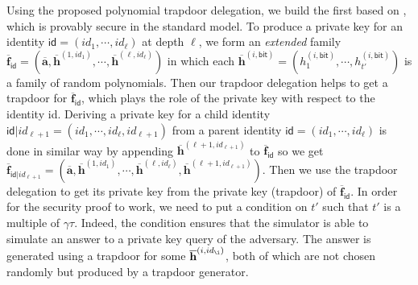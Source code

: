 \documentclass[runningheads]{llncs}
\begin{document}
 Using the proposed polynomial trapdoor delegation, we build the first  based on , which is provably  secure in the standard model. 
 To produce a private key for an identity $\textsf{id}=(id_1, \cdots, id_{\ell})$ at depth $\ell$, 
 we form an \textit{extended} family $\overline{\mathbf{f}}_{\mathsf{id}}=(\overline{\mathbf{a}}, \overline{\mathbf{h}}^{(1,id_1)},  \cdots,\overline{\mathbf{h}}^{(\ell,id_{\ell})})$ in which each $\overline{\mathbf{h}}^{(i,\mathsf{bit})}=(h_1^{(i,\mathsf{bit})}, \cdots,h_{t'}^{(i,\mathsf{bit})} )$ is a family of random polynomials.
Then our trapdoor delegation helps to get a trapdoor for $\overline{\mathbf{f}}_{\mathsf{id}}$, which plays the role of the private key with respect to the identity \textsf{id}. 
Deriving a private key for a child identity $\textsf{id}|id_{\ell+1}=(id_1, \cdots, id_{\ell}, id_{\ell+1})$ from a parent identity $\textsf{id}=(id_1, \cdots, id_{\ell})$ is done in similar way by appending $\overline{\mathbf{h}}^{(\ell+1,id_{\ell+1})}$ to $\overline{\mathbf{f}}_{\mathsf{id}}$  
so we get $\overline{\mathbf{f}}_{\mathsf{id}|id_{\ell+1}}=(\overline{\mathbf{a}},  \overline{\mathbf{h}}^{(1,id_1)},  \cdots,\overline{\mathbf{h}}^{(\ell,id_{\ell})},\overline{\mathbf{h}}^{(\ell+1,id_{\ell+1})})$.
Then we use the trapdoor delegation to get its private key from the private key (trapdoor) of $\overline{\mathbf{f}}_{\mathsf{id}}$. 
In order for the security proof to work, we need to put a condition on $t'$ 
such  that $t'$ is a multiple of $\gamma \tau$. 
Indeed, the condition ensures that the simulator is able to simulate an answer 
to a private key query of the adversary.
The answer is generated
 using a trapdoor for some $\overline{\mathbf{h}}^{(i,id_{\i})}$, both of which are not chosen randomly but produced by a trapdoor generator.\\
 
\end{document}
